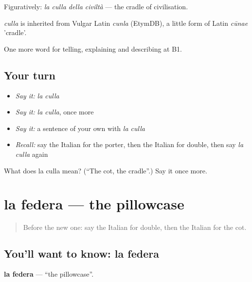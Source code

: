 Figuratively: \emph{la culla della civiltà} — the cradle of civilisation.

\begin{cousinweb}
\emph{culla} is inherited from Vulgar Latin \emph{cunla} (EtymDB), a little form of Latin \emph{cūnae} 'cradle'.
\end{cousinweb}

\begin{grammarlens}[title={What you've built}]
One more word for telling, explaining and describing at B1.
\end{grammarlens}

\subsection*{Your turn}
\begin{itemize}
\raggedright
  \item \emph{Say it:} \emph{la culla}
  \item \emph{Say it:} \emph{la culla}, once more
  \item \emph{Say it:} a sentence of your own with \emph{la culla}
  \item \emph{Recall:} say the Italian for the porter, then the Italian for double, then say \emph{la culla} again
\end{itemize}

\begin{tcolorbox}[breakable,colback=teal!4,colframe=teal!35!black,title={Before you move on}]
What does la culla mean? (\textquotedblleft{}The cot, the cradle\textquotedblright{}.) Say it once more.
\end{tcolorbox}
\section[la federa]{la federa — the pillowcase}

\label{lesson:IT-C433-federa}



\begin{quote}
Before the new one: say the Italian for double, then the Italian for the cot.
\end{quote}

\subsection*{You'll want to know: la federa}
\textbf{la federa} — \textquotedblleft{}the pillowcase\textquotedblright{}.

